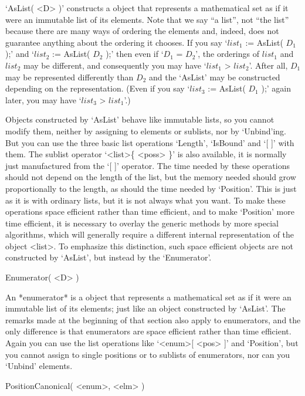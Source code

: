 `AsList( <D> )' constructs a {\GAP} object that represents a mathematical
set as if it were an immutable list of its elements. Note that we say ``a
list'', not   ``the list'' because there  are  many ways  of ordering the
elements and,  indeed,  {\GAP}  does  not  guarantee anything  about  the
ordering it   chooses. If you  say   `$list_1$ := AsList(   $D_1$ );' and
`$list_2$ := AsList( $D_2$    );' then even   if  `$D_1$ =   $D_2$',  the
orderings of $list_1$ and $list_2$ may be different, and consequently you
may have  `$list_1$ \<> $list_2$'. After   all, $D_1$ may  be represented
differently  than $D_2$ and the `AsList'  may be constructed depending on
the representation. (Even if you say `$list_3$ := AsList( $D_1$ );' again
later, you may have `$list_3$ \<> $list_1$'.)

Objects constructed  by  `AsList'  behave like  immutable  lists,  so you
cannot modify them, neither by assigning to elements  or sublists, nor by
`Unbind'ing. But you  can use the three  basic  list operations `Length',
`IsBound' and `[ ]' with them.  The sublist operator `<list>\{ <poss> \}'
is  also  available, it  is  normally  just  manufactured from  the `[ ]'
operator. The  time needed by  these operations should  not depend on the
length of  the list, but the  memory needed should grow proportionally to
the length, as should  the time needed by `Position'.  This is just as it
is with ordinary lists, but it is not always what you want. To make these
operations  space  efficient  rather  than time  efficient,   and to make
`Position' more time  efficient, it is necessary  to  overlay the generic
methods by   more  special algorithms, which   will  generally  require a
different internal representation of the object <list>. To emphasize this
distinction,  such space   efficient    objects are not  constructed   by
`AsList', but instead by the `Enumerator'.

\>Enumerator( <D> )

An *enumerator* is a {\GAP} object that  represents a mathematical set as
if  it  were an  immutable   list of its elements;  just   like an object
constructed by   `AsList'.  The remarks   made at  the beginning  of that
section also  apply  to enumerators,  and the  only  difference is   that
enumerators are space efficient rather than time efficient. Again you can
use  the list operations like `<enum>[  <pos>  ]' and `Position', but you
cannot assign to single positions or to sublists  of enumerators, nor can
you `Unbind' elements.

\>PositionCanonical( <enum>, <elm> )


